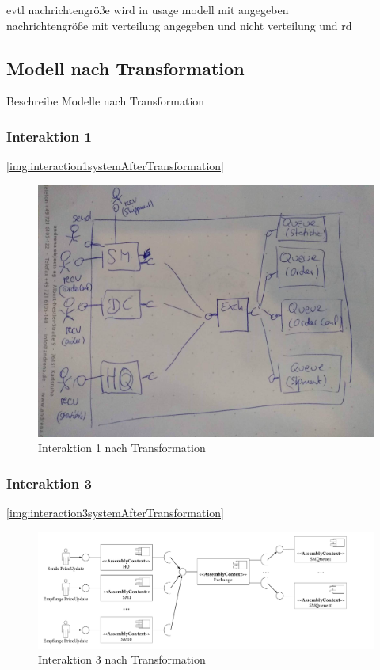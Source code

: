 evtl nachrichtengröße wird in usage modell mit angegeben \\
nachrichtengröße mit verteilung angegeben und nicht verteilung und rd


\subsection{Modell nach Transformation}
Beschreibe Modelle nach Transformation \\
\subsubsection{Interaktion 1}
\autoref{img:interaction1systemAfterTransformation}
\begin{figure}
\center
  \includegraphics[width=1\textwidth]{images/evaluation/specjms/interaction1system.png}
  \caption{Interaktion 1 nach Transformation}
  \label{img:interaction1systemAfterTransformation}
\end{figure}
\subsubsection{Interaktion 3}
\autoref{img:interaction3systemAfterTransformation}
\begin{figure}
\center
  \includegraphics[width=1\textwidth]{images/evaluation/specjms/evaluationInteraktion3new.pdf}
  \caption{Interaktion 3 nach Transformation}
  \label{img:interaction3systemAfterTransformation}
\end{figure}


